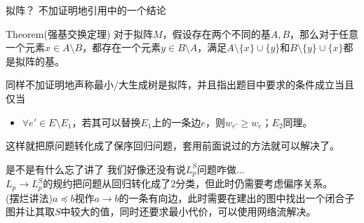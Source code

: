\documentclass{beamer}
\begin{document}
\begin{frame}{拟阵？}
	不加证明地引用\cite{p2}中的一个结论
	\begin{block}{Theorem(强基交换定理)}
		对于拟阵$M$，假设存在两个不同的基$A, B$，那么对于任意一个元素$x \in A \setminus B$，都存在一个元素$y \in B \setminus A$，满足$A \setminus \{x\} \cup \{y\}$和$B \setminus \{y\} \cup \{x\}$都是拟阵的基。
	\end{block}\pause
	
	同样不加证明地声称最小/大生成树是拟阵，并且指出题目中要求的条件成立当且仅当
	\begin{itemize}
		\item $\forall e' \in E \setminus E_1$，若其可以替换$E_1$上的一条边$e$，则$w_{e'} \ge w_e$；$E_2$同理。
	\end{itemize}

	\pause
	
	这样就把原问题转化成了保序回归问题，套用前面说过的方法就可以解决了。
	
\end{frame}

\begin{frame}{是不是有什么忘了讲了}
	我们好像还没有说$L_p^S$问题咋做...\\
	
	$L_p \to L_p^S$的规约把问题从回归转化成了$2$分类，但此时仍需要考虑偏序关系。\pause \\
	
	(摆烂讲法)$a \preceq b$视作$a \to b$的一条有向边，此时需要在建出的图中找出一个闭合子图并让其取$S$中较大的值，同时还要求最小代价，可以使用网络流解决。
\end{frame}
\end{document}
